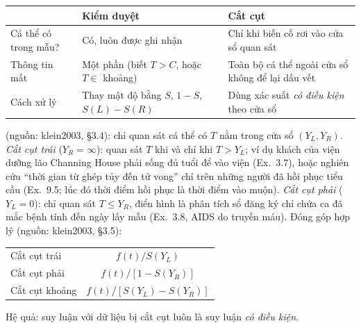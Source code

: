 \documentclass[11pt,a4paper,notitlepage]{report}
\providecommand{\nguon}[1]{(nguồn: #1)}
\begin{document}
\begin{bosung}
\begin{center}\small
\begin{tabular}{p{3.4cm}p{5.3cm}p{5.2cm}}
\toprule
 & Kiểm duyệt & Cắt cụt\\
\midrule
Cá thể có trong mẫu? & Có, luôn được ghi nhận & Chỉ khi biến cố rơi vào cửa sổ quan sát\\
Thông tin mất & Một phần (biết $T>C$, hoặc $T\in$ khoảng) & Toàn bộ cá thể ngoài cửa sổ không để lại dấu vết\\
Cách xử lý & Thay mật độ bằng $S$, $1-S$, $S(L)-S(R)$ & Dùng xác suất \emph{có điều kiện} theo cửa sổ\\
\bottomrule
\end{tabular}
\end{center}
\nguon{klein2003, \S3.4}: chỉ quan sát cá thể có $T$ nằm trong cửa sổ $(Y_L,Y_R)$.
\emph{Cắt cụt trái} ($Y_R=\infty$): quan sát $T$ khi và chỉ khi $T>Y_L$; ví dụ khách của viện dưỡng lão Channing House phải sống đủ tuổi để vào viện
(Ex.~3.7), hoặc nghiên cứu ``thời gian từ ghép tủy đến tử vong'' chỉ trên những người đã hồi phục tiểu cầu (Ex.~9.5; lúc đó thời điểm hồi phục là thời điểm vào muộn).
\emph{Cắt cụt phải} ($Y_L=0$): chỉ quan sát $T\le Y_R$, điển hình là phân tích sổ đăng ký chỉ chứa ca đã mắc bệnh tính đến ngày lấy mẫu (Ex.~3.8, AIDS do truyền máu).
Đóng góp hợp lý \nguon{klein2003, \S3.5}:
\begin{center}\small
\begin{tabular}{lc}
\toprule
Cắt cụt trái & $f(t)/S(Y_L)$\\
Cắt cụt phải & $f(t)/[1-S(Y_R)]$\\
Cắt cụt khoảng & $f(t)/[S(Y_L)-S(Y_R)]$\\
\bottomrule
\end{tabular}
\end{center}
Hệ quả: suy luận với dữ liệu bị cắt cụt luôn là suy luận \emph{có điều kiện}.
\end{bosung}
\end{document}
